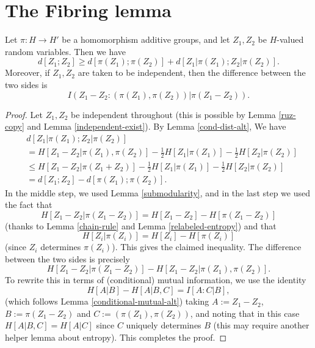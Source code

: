\chapter{The Fibring lemma}

\begin{proposition}\label{fibring-ident}
  \leanok
  Let $\pi : H \to H'$ be a homomorphism additive groups, and let $Z_1,Z_2$ be $H$-valued random variables. Then we have
  \[
    d[Z_1; Z_2] \geq d[\pi(Z_1);\pi(Z_2)] + d[Z_1|\pi(Z_1); Z_2 |\pi(Z_2)].
  \]
  Moreover, if $Z_1,Z_2$ are taken to be independent, then the difference between the two sides is
$$I( Z_1 - Z_2 : (\pi(Z_1), \pi(Z_2))  |  \pi(Z_1 - Z_2) ).$$
\end{proposition}


\begin{proof}\leanok
  Let $Z_1,Z_2$ be independent throughout (this is possible by Lemma \ref{ruz-copy} and Lemma \ref{independent-exist}).  By Lemma \ref{cond-dist-alt}, We have
  \begin{align*}
    & d[Z_1  |\pi(Z_1); Z_2 |\pi(Z_2)] \\
    & = H[ Z_1 - Z_2 | \pi(Z_1),\pi(Z_2)] - \tfrac{1}{2} H[Z_1 | \pi(Z_1)] - \tfrac{1}{2} H[Z_2 | \pi(Z_2)] \\
    & \leq  H[ Z_1 - Z_2 | \pi(Z_1+Z_2)]  - \tfrac{1}{2} H[Z_1 | \pi(Z_1)] - \tfrac{1}{2}H[Z_2 | \pi(Z_2)] \\
    & = d[Z_1;Z_2] - d[\pi(Z_1);\pi(Z_2)].
  \end{align*}
  In the middle step, we used Lemma \ref{submodularity}, and in the last step we used the fact that
  \[ H[Z_1 - Z_2 |  \pi(Z_1-Z_2)] = H[Z_1 - Z_2] - H[\pi(Z_1-Z_2)]\]
  (thanks to Lemma \ref{chain-rule} and Lemma \ref{relabeled-entropy}) and that
  \[ H[Z_i| \pi(Z_i)] = H[Z_i] - H[\pi(Z_i)]\] (since $Z_i$ determines $\pi(Z_i)$).
  This gives the claimed inequality. The difference between the two sides is precisely
  \[ H[Z_1 - Z_2  | \pi(Z_1 - Z_2)] - H[Z_1 - Z_2  | \pi(Z_1),\pi(Z_2)].\]
  To rewrite this in terms of (conditional) mutual information, we use the identity
  \[ H[A|B] - H[A | B,C] = I[A : C | B],\]
  (which follows Lemma \ref{conditional-mutual-alt})
  taking
  $A := Z_1 - Z_2$, $B := \pi(Z_1 - Z_2)$ and $C := (\pi(Z_1),\pi(Z_{2}))$, and noting that in this case $H[A | B,C] = H[A | C]$ since $C$ uniquely determines $B$ (this may require another helper lemma about entropy).
  This completes the proof.
\end{proof}

